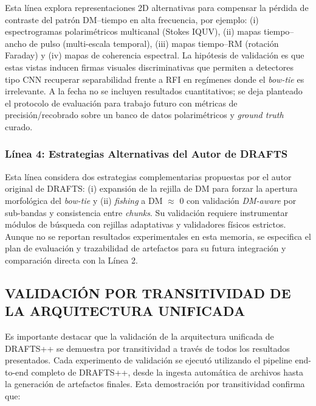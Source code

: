 Esta línea explora representaciones 2D alternativas para compensar la pérdida de contraste del patrón DM--tiempo en alta frecuencia, por ejemplo: (i) espectrogramas polarimétricos multicanal (Stokes IQUV), (ii) mapas tiempo--ancho de pulso (multi-escala temporal), (iii) mapas tiempo--RM (rotación Faraday) y (iv) mapas de coherencia espectral. La hipótesis de validación es que estas vistas inducen firmas visuales discriminativas que permiten a detectores tipo CNN recuperar separabilidad frente a RFI en regímenes donde el \emph{bow-tie} es irrelevante. A la fecha no se incluyen resultados cuantitativos; se deja planteado el protocolo de evaluación para trabajo futuro con métricas de precisión/recobrado sobre un banco de datos polarimétricos y \emph{ground truth} curado.

\subsubsection{Línea 4: Estrategias Alternativas del Autor de DRAFTS}

Esta línea considera dos estrategias complementarias propuestas por el autor original de DRAFTS: (i) expansión de la rejilla de DM para forzar la apertura morfológica del \emph{bow-tie} y (ii) \emph{fishing} a DM \(\approx\) 0 con validación \emph{DM-aware} por sub-bandas y consistencia entre \emph{chunks}. Su validación requiere instrumentar módulos de búsqueda con rejillas adaptativas y validadores físicos estrictos. Aunque no se reportan resultados experimentales en esta memoria, se especifica el plan de evaluación y trazabilidad de artefactos para su futura integración y comparación directa con la Línea 2.

\subsection{VALIDACIÓN POR TRANSITIVIDAD DE LA ARQUITECTURA UNIFICADA}

Es importante destacar que la validación de la arquitectura unificada de DRAFTS++ se demuestra por transitividad a través de todos los resultados presentados. Cada experimento de validación se ejecutó utilizando el pipeline end-to-end completo de DRAFTS++, desde la ingesta automática de archivos hasta la generación de artefactos finales. Esta demostración por transitividad confirma que:

